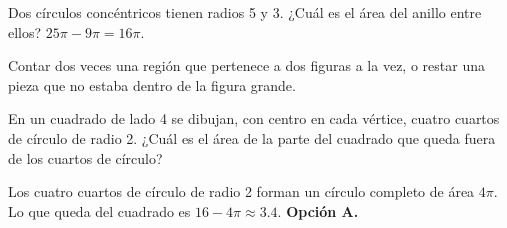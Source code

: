 \begin{ejemplo}[Corona]
Dos círculos concéntricos tienen radios 5 y 3. ¿Cuál es el área del anillo entre ellos?
\solucion $25\pi - 9\pi = 16\pi$.
\end{ejemplo}

\begin{trampa}
Contar dos veces una región que pertenece a dos figuras a la vez, o restar una pieza que no estaba dentro de la figura
grande.
\end{trampa}

\begin{reto}
En un cuadrado de lado 4 se dibujan, con centro en cada vértice, cuatro cuartos de círculo de radio 2. ¿Cuál es el área
de la parte del cuadrado que queda fuera de los cuartos de círculo?
\end{reto}

\begin{retoresuelto}
Los cuatro cuartos de círculo de radio 2 forman un círculo completo de área $4\pi$. Lo que queda del cuadrado es
$16 - 4\pi \approx 3.4$. \textbf{Opción A.}
\end{retoresuelto}

